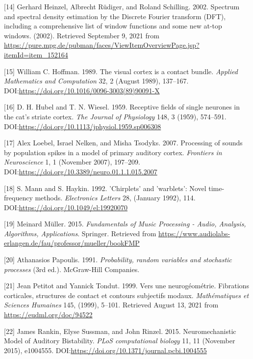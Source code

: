 \documentclass[american,]{article}
\theoremstyle{definition}
\theoremstyle{definition}
\theoremstyle{definition}
\theoremstyle{remark}
\begin{document}
\leavevmode\hypertarget{ref-heinzel2002}{}%
{[}14{]} Gerhard Heinzel, Albrecht Rüdiger, and Roland Schilling. 2002. Spectrum and spectral density estimation by the Discrete Fourier transform (DFT), including a comprehensive list of window functions and some new at-top windows. (2002). Retrieved September 9, 2021 from \url{https://pure.mpg.de/pubman/faces/ViewItemOverviewPage.jsp?itemId=item_152164}

\leavevmode\hypertarget{ref-hoffman1989}{}%
{[}15{]} William C. Hoffman. 1989. The visual cortex is a contact bundle. \emph{Applied Mathematics and Computation} 32, 2 (August 1989), 137--167. DOI:\url{https://doi.org/10.1016/0096-3003(89)90091-X}

\leavevmode\hypertarget{ref-hubel1959}{}%
{[}16{]} D. H. Hubel and T. N. Wiesel. 1959. Receptive fields of single neurones in the cat's striate cortex. \emph{The Journal of Physiology} 148, 3 (1959), 574--591. DOI:\url{https://doi.org/10.1113/jphysiol.1959.sp006308}

\leavevmode\hypertarget{ref-loebel2007}{}%
{[}17{]} Alex Loebel, Israel Nelken, and Misha Tsodyks. 2007. Processing of sounds by population spikes in a model of primary auditory cortex. \emph{Frontiers in Neuroscience} 1, 1 (November 2007), 197--209. DOI:\url{https://doi.org/10.3389/neuro.01.1.1.015.2007}

\leavevmode\hypertarget{ref-mann1992}{}%
{[}18{]} S. Mann and S. Haykin. 1992. 'Chirplets' and 'warblets': Novel time-frequency methods. \emph{Electronics Letters} 28, (January 1992), 114. DOI:\url{https://doi.org/10.1049/el:19920070}

\leavevmode\hypertarget{ref-muller2015}{}%
{[}19{]} Meinard Müller. 2015. \emph{Fundamentals of Music Processing - Audio, Analysis, Algorithms, Applications}. Springer. Retrieved from \url{https://www.audiolabs-erlangen.de/fau/professor/mueller/bookFMP}

\leavevmode\hypertarget{ref-papoulis1991}{}%
{[}20{]} Athanasios Papoulis. 1991. \emph{Probability, random variables and stochastic processes} (3rd ed.). McGraw-Hill Companies.

\leavevmode\hypertarget{ref-petitot1999}{}%
{[}21{]} Jean Petitot and Yannick Tondut. 1999. Vers une neurogéométrie. Fibrations corticales, structures de contact et contours subjectifs modaux. \emph{Mathématiques et Sciences Humaines} 145, (1999), 5--101. Retrieved August 13, 2021 from \url{https://eudml.org/doc/94522}

\leavevmode\hypertarget{ref-rankin2015}{}%
{[}22{]} James Rankin, Elyse Sussman, and John Rinzel. 2015. Neuromechanistic Model of Auditory Bistability. \emph{PLoS computational biology} 11, 11 (November 2015), e1004555. DOI:\url{https://doi.org/10.1371/journal.pcbi.1004555}
\end{document}
